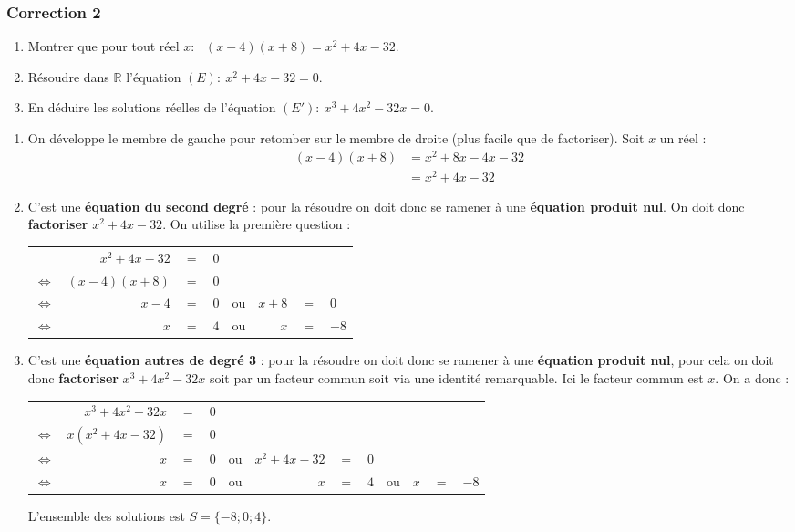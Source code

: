 \documentclass[15pt, mathserif]{beamer}
\newcommand{\R}{\mathbb{R}}			%
\newcommand{\ligneq}[2]{$\Longleftrightarrow$ & $#1$ & $=$ & $#2$ \\}
\newcommand{\Ligneq}[2]{ & $#1$ & $=$ & $#2$ \\}
\newenvironment{RPN}{\begin{center}\begin{tabular}{rrclcrcl}}{\end{tabular}\end{center}}
\newcommand{\lignerpn}[4]{$\Longleftrightarrow$ & $#1$ & $=$ & $#2$ & ou & $#3$ & $=$ & $#4$ \\}
\newenvironment{TRPN}{\begin{center}\begin{tabular}{rrclcrclcrcl}}{\end{tabular}\end{center}}
\newcommand{\lignetrpn}[6]{$\Longleftrightarrow$ & $#1$ & $=$ & $#2$ & ou & $#3$ & $=$ & $#4$ & ou & $#5$ & $=$ & $#6$ \\}
\begin{document}
\begin{frame}
\vspace{-10mm}
	\frametitle{Correction 2}
\begin{enumerate} 
 	 \item Montrer que pour tout réel $x$:~ $(x-4)(x+8)=x^2+4x-32$. 
 	 \item Résoudre dans $\R$ l'équation $(E):~x^2+4x-32= 0$. 
 	 \item En déduire les solutions réelles de l'équation $(E'):~x^3+4x^2-32x = 0$. 
 \end{enumerate} 
 
 \bigskip 
 \bigskip 
 \begin{enumerate} 
 	 \item On développe le membre de gauche pour retomber sur le membre de droite (plus facile que de factoriser). Soit $x$ un réel : 
 	 	 \begin{align*} 
 	 	 (x-4)(x+8)&=x^2+8x-4x-32 \\ 
 	 	 	 &=x^2+4x-32 
 	 \end{align*} 
 \end{enumerate} 
 \end{frame} 
 \begin{frame} 
 \begin{enumerate} \setcounter{enumi}{1}  
 	 \item C'est une \textbf{équation du second degré} : pour la résoudre on doit donc se ramener à une \textbf{équation produit nul}. On doit donc \textbf{factoriser} $x^2+4x-32$. On utilise la première question : 
 	 	  \begin{RPN} 
 	 	  	 \Ligneq{x^2+4x-32}{0} 
 	 	 	 \ligneq{(x-4)(x+8)}{0} 
 	 	 	 \lignerpn{x-4}{0}{x+8}{0} 
 	 	 	 \lignerpn{x}{4}{x}{-8} 
 	 	  \end{RPN} 
 	 \item C'est une \textbf{équation autres de degré 3} : pour la résoudre on doit donc se ramener à une \textbf{équation produit nul}, pour cela on doit donc \textbf{factoriser} $x^3+4x^2-32x $ soit par un facteur commun soit via une identité remarquable. Ici le facteur commun est $x$. On a donc : 
 	 	 \begin{footnotesize} 
 \begin{TRPN} 
 	 	 	 \Ligneq{x^3+4x^2-32x}{0} 
 	 	 	 \ligneq{x(x^2+4x-32)}{0} 
 	 	 	 \lignerpn{x}{0}{x^2+4x-32}{0} 
 	 	 	 \lignetrpn{x}{0}{x}{4}{x}{-8} 
 	 	 \end{TRPN} 
 \end{footnotesize} L'ensemble des solutions est $S=\{-8;0;4\}$. 
 \end{enumerate} 
 
 \end{frame}
\end{document}
